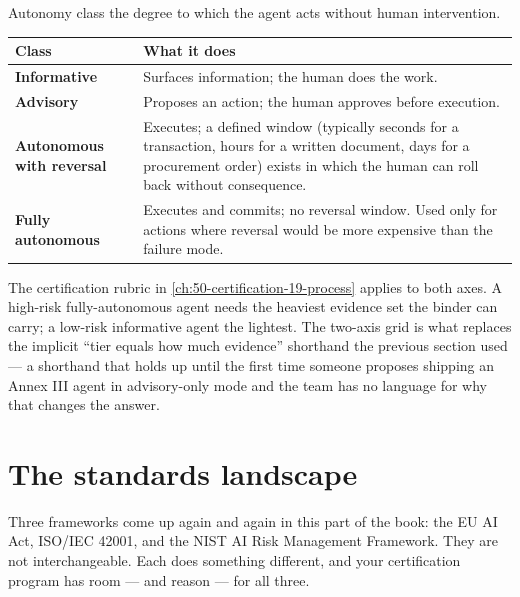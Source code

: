 \begin{TNdefinition}{Autonomy class} the degree to which the agent acts without human intervention. \end{TNdefinition}

\stoptwocol

\begin{center}
\small
\begin{tabularx}{\textwidth}{@{}l X@{}}
\toprule
\textbf{Class} & \textbf{What it does} \\
\midrule
\textbf{Informative} & Surfaces information; the human does the work. \\
\addlinespace
\textbf{Advisory} & Proposes an action; the human approves before execution. \\
\addlinespace
\textbf{Autonomous with reversal} & Executes; a defined window (typically seconds for a transaction, hours for a written document, days for a procurement order) exists in which the human can roll back without consequence. \\
\addlinespace
\textbf{Fully autonomous} & Executes and commits; no reversal window. Used only for actions where reversal would be more expensive than the failure mode. \\
\bottomrule
\end{tabularx}
\end{center}

\starttwocol

The certification rubric in \autoref{ch:50-certification-19-process} applies to both axes. A high-risk fully-autonomous agent needs the heaviest evidence set the binder can carry; a low-risk informative agent the lightest. The two-axis grid is what replaces the implicit ``tier equals how much evidence'' shorthand the previous section used --- a shorthand that holds up until the first time someone proposes shipping an Annex III agent in advisory-only mode and the team has no language for why that changes the answer.

\section{The standards landscape}

Three frameworks come up again and again in this part of the book: the EU AI Act, ISO/IEC 42001, and the NIST AI Risk Management Framework. They are not interchangeable. Each does something different, and your certification program has room --- and reason --- for all three.

